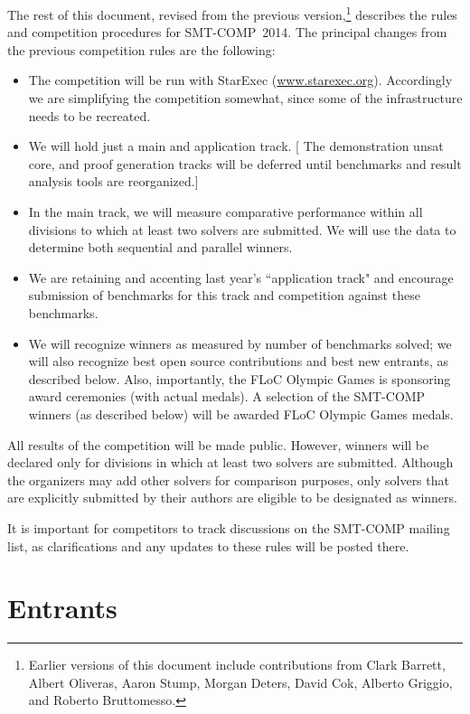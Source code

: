 \documentclass[12pt]{article}
\begin{document}
The rest of this document, revised from the previous 
version,\footnote{Earlier versions of this document include contributions from
Clark Barrett, Albert Oliveras, Aaron Stump, Morgan Deters, David Cok, Alberto Griggio, and Roberto Bruttomesso.}
describes the rules and competition procedures for SMT-COMP~2014.
The principal changes from the previous competition rules are the following:
\begin{itemize}
\item The competition will be run with StarExec (\url{www.starexec.org}). Accordingly we are simplifying the competition somewhat, since some of the infrastructure needs to be recreated.
\item We will hold just a main and application track. [ The demonstration unsat core, and proof generation tracks will be deferred until benchmarks and result analysis tools are reorganized.]
\item In the main track, we will measure comparative performance within all divisions to which at least two solvers are submitted. We will use the data to determine both sequential and parallel winners.

\item We are retaining and accenting last year's ``application track" and
  encourage submission of benchmarks for this track and competition against these
  benchmarks.

\item We will recognize winners as measured by number of benchmarks solved; we will also recognize best open source contributions and best new entrants, as described below. 
Also, importantly, the FLoC Olympic Games is sponsoring award ceremonies (with actual medals). A selection of the SMT-COMP winners (as described below) will be awarded FLoC Olympic Games medals.

\end{itemize}

All results of the competition will be made public. However, 
winners will be declared only for divisions in which at least two solvers are submitted.
Although the organizers may add other solvers for comparison purposes, only solvers that
are explicitly submitted by their authors are eligible to be designated as winners.

It is important for competitors to track discussions on the SMT-COMP mailing
list, as clarifications and any updates to these rules will be posted there.

\section{Entrants}
\label{sec:entrants}
\end{document}
